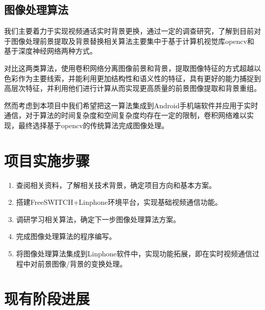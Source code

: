 \documentclass[14pt]{extarticle}
\newcommand{\<}{\langle}
\renewcommand{\>}{\rangle}
\theoremstyle{definition}
\begin{document}
\subsection{图像处理算法}
\par{\qquad 我们主要着力于实现视频通话实时背景更换，通过一定的调查研究，了解到目前对于图像处理前景提取及背景替换相关算法主要集中于基于计算机视觉库opencv和基于深度神经网络两种方式。}
\par{对比这两类算法，使用卷积网络分离图像前景和背景，提取图像特征的方式超越以色彩作为主要线索，并能利用更加结构性和语义性的特征，具有更好的能力捕捉到高层次特征，并利用他们进行计算从而实现更高质量的前景图像提取和背景重组。}
\par{然而考虑到本项目中我们希望把这一算法集成到Android手机端软件并应用于实时通信，对于算法的时间复杂度和空间复杂度均存在一定的限制，卷积网络难以实现，最终选择基于opencv的传统算法完成图像处理。}

\section{项目实施步骤}
\begin{enumerate}
    \item 查阅相关资料，了解相关技术背景，确定项目方向和基本方案。
    \item 搭建FreeSWITCH+Linphone环境平台，实现基础视频通信功能。
    \item 调研学习相关算法，确定下一步图像处理算法方案。
    \item 完成图像处理算法的程序编写。
    \item 将图像处理算法集成到Linphone软件中，实现功能拓展，即在实时视频通信过程中对前景图像/背景的变换处理。
\end{enumerate}

\section{现有阶段进展}
\end{document}
